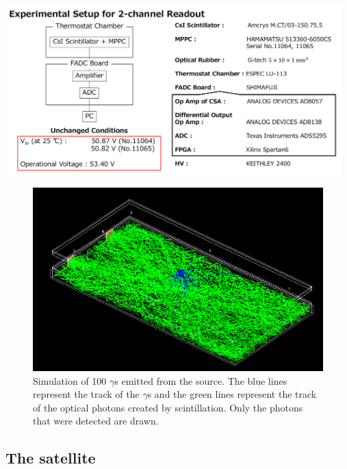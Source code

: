 \documentclass[12pt, a4paper,titlepage]{article}
\numberwithin{equation}{section}
\numberwithin{figure}{section}
\begin{document}
\includegraphics[width=130.0mm]{images/2channelelectronics.png}

\begin{figure}[H]
\centering
\includegraphics[width=160.0mm]{images/2channel.png}
\caption{Simulation of 100 $\gamma$s emitted from the source. The blue lines represent the track of the $\gamma$s and the green lines represent the track of the optical photons created by scintillation. Only the photons that were detected are drawn.}
\end{figure}

\subsection{The satellite}
\end{document}
